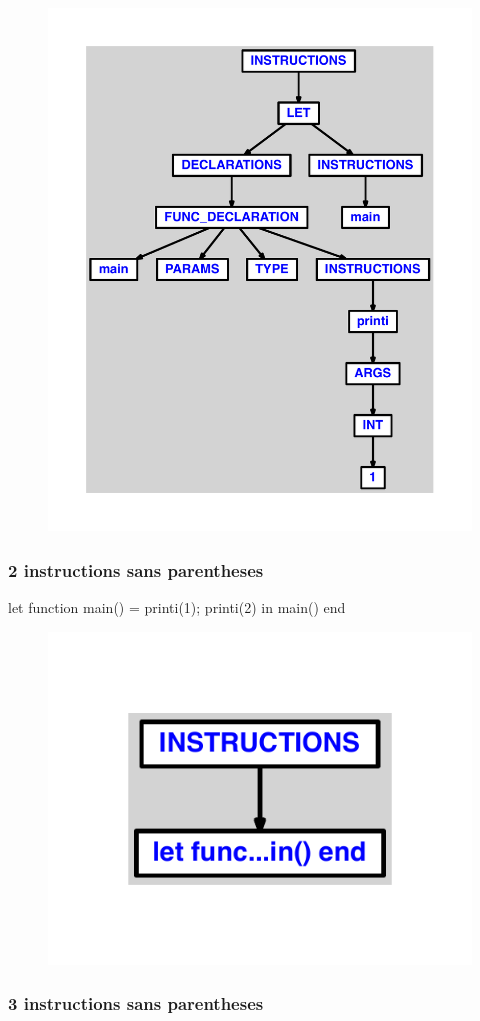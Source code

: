 \documentclass{article}
\begin{document}
\begin{figure}[H]\centering\includegraphics[max width=\textwidth]{ast/ast_138.pdf}\end{figure}\subsubsection{2 instructions sans parentheses}
\begin{verbatimtab}
let function main() = printi(1); printi(2) in main() end
\end{verbatimtab}
\begin{figure}[H]\centering\includegraphics[max width=\textwidth]{ast/ast_139.pdf}\end{figure}\subsubsection{3 instructions sans parentheses}
\end{document}
